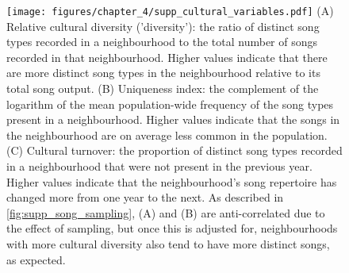 \documentclass[9pt, onecolumn, twoside, lineno]{gsajnl}
\begin{document}
\begin{figure}[tbp]
    \centering
    \texttt{[image: figures/chapter\_4/supp\_cultural\_variables.pdf]}
    {
        (A) Relative cultural diversity ('diversity'): the ratio of distinct song types recorded in a neighbourhood to the total number of songs recorded in that neighbourhood. Higher values indicate that there are more distinct song types in the neighbourhood relative to its total song output.
        (B) Uniqueness index: the complement of the logarithm of the mean population-wide frequency of the song types present in a neighbourhood. Higher values indicate that the songs in the neighbourhood are on average less common in the population.
        (C) Cultural turnover: the proportion of distinct song types recorded in a neighbourhood that were not present in the previous year. Higher values indicate that the neighbourhood's song repertoire has changed more from one year to the next.
        As described in \autoref{fig:supp_song_sampling}, (A) and (B) are anti-correlated due to the effect of sampling, but once this is adjusted for, neighbourhoods with more cultural diversity also tend to have more distinct songs, as expected.
        }
    \label{fig:supp_cultural_variables}
\end{figure}
\end{document}
